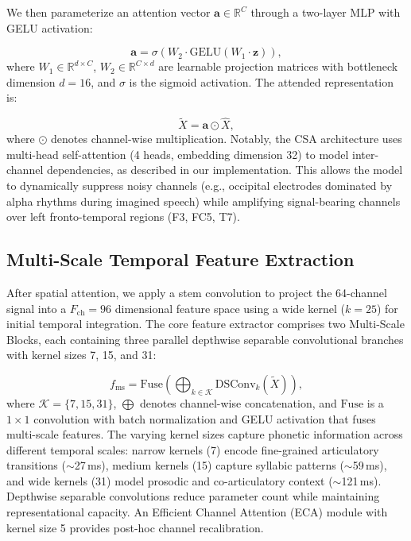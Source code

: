 \documentclass[conference]{IEEEtran}
\begin{document}
We then parameterize an attention vector $\mathbf{a} \in \mathbb{R}^{C}$ through a two-layer MLP with GELU activation:

\begin{equation}
	\mathbf{a} = \sigma\left(W_2 \cdot \text{GELU}(W_1 \cdot \mathbf{z})\right),
\end{equation}
where $W_1 \in \mathbb{R}^{d \times C}$, $W_2 \in \mathbb{R}^{C \times d}$ are learnable projection matrices with bottleneck dimension $d = 16$, and $\sigma$ is the sigmoid activation. The attended representation is:

\begin{equation}
	\tilde{X} = \mathbf{a} \odot \hat{X},
\end{equation}
where $\odot$ denotes channel-wise multiplication. Notably, the CSA architecture uses multi-head self-attention (4 heads, embedding dimension 32) to model inter-channel dependencies, as described in our implementation. This allows the model to dynamically suppress noisy channels (e.g., occipital electrodes dominated by alpha rhythms during imagined speech) while amplifying signal-bearing channels over left fronto-temporal regions (F3, FC5, T7).

\subsection{Multi-Scale Temporal Feature Extraction}
After spatial attention, we apply a stem convolution to project the 64-channel signal into a $F_{\text{ch}} = 96$ dimensional feature space using a wide kernel ($k = 25$) for initial temporal integration. The core feature extractor comprises two Multi-Scale Blocks, each containing three parallel depthwise separable convolutional branches with kernel sizes 7, 15, and 31:

\begin{equation}
	f_{\text{ms}} = \text{Fuse}\left(\bigoplus_{k \in \mathcal{K}} \text{DSConv}_k(\tilde{X})\right),
\end{equation}
where $\mathcal{K} = \{7, 15, 31\}$, $\bigoplus$ denotes channel-wise concatenation, and $\text{Fuse}$ is a $1 \times 1$ convolution with batch normalization and GELU activation that fuses multi-scale features. The varying kernel sizes capture phonetic information across different temporal scales: narrow kernels (7) encode fine-grained articulatory transitions ($\sim$27\,ms), medium kernels (15) capture syllabic patterns ($\sim$59\,ms), and wide kernels (31) model prosodic and co-articulatory context ($\sim$121\,ms). Depthwise separable convolutions reduce parameter count while maintaining representational capacity. An Efficient Channel Attention (ECA) module \cite{wang2020eca} with kernel size 5 provides post-hoc channel recalibration.
\end{document}
